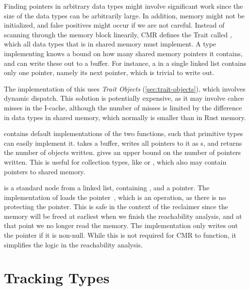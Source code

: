 Finding pointers in arbitrary data types might involve significant work since the size of the data
types can be arbitrarily large. In addition, memory might not be initialized, and false positives
might occur if we are not careful. Instead of scanning through the memory block linearily, CMR
defines the Trait called , which all data types that is in shared memory must
implement.  A type implementing  knows a bound on how many shared memory pointers it
contains, and can write these out to a buffer. For instance, a  in a single linked list
contains only one pointer, namely its next pointer, which is trivial to write out.

The implementation of this uses \emph{Trait Objects} (\cref{sec:trait-objects}), which involves
dynamic dispatch. This solution is potentially expensive, as it may involve cahce misses in the
I-cache, although the number of misses is limited by the difference in data types in shared memory,
which normally is smaller than in Rust memory.

\begin{figure}[ht]
  
\end{figure}

 contains default implementations of the two functions, such that primitive types can
easily implement it.  takes a buffer, writes all pointers to it as s,
and returns the number of objects written.  gives an upper bound on the number of
pointers written. This is useful for collection types, like  or , which
also may contain pointers to shared memory.

 is a standard node from a linked list, containing , and a 
pointer. The implementation of  loads the  pointer~, which is
an  operation, as there is no  protecting the pointer. This is safe in the
context of the reclaimer since the memory will be freed at earliest when we finish the reachability
analysis, and at that point we no longer read the memory. The implementation only writes out the
pointer if it is non-null. While this is not required for CMR to function, it simplifies the logic
in the reachability analysis.


\section{Tracking Types\label{sec:impl-tracking-types}}

